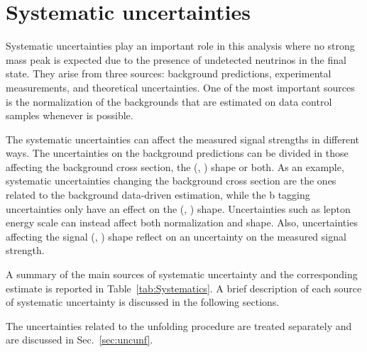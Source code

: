 \section{Systematic uncertainties}
\label{sec:Systematics}

Systematic uncertainties play an important role in this analysis where
no strong mass peak is expected due to the presence of undetected
neutrinos in the final state. They arise from three sources: background predictions, experimental measurements, and theoretical uncertainties. One of the most important sources is the normalization of the backgrounds that are estimated on data control samples whenever is possible.

The systematic uncertainties can affect the measured signal strengths in different ways. The uncertainties on the background predictions can be divided in those affecting the background cross section, the (\mll, \mt) shape or both. As an example, systematic uncertainties changing the background cross section are the ones related to the background data-driven estimation, while the b tagging uncertainties only have an effect on the (\mll, \mt) shape. Uncertainties such as lepton energy scale can instead affect both normalization and shape. Also, uncertainties affecting the signal (\mll, \mt) shape reflect on an uncertainty on the measured signal strength. 

A summary of the main sources of systematic uncertainty and the corresponding estimate is reported in Table~\ref{tab:Systematics}. A brief description of each source of systematic uncertainty is discussed in the following sections.

The uncertainties related to the unfolding procedure are treated separately and are discussed in Sec.~\ref{sec:uncunf}.

